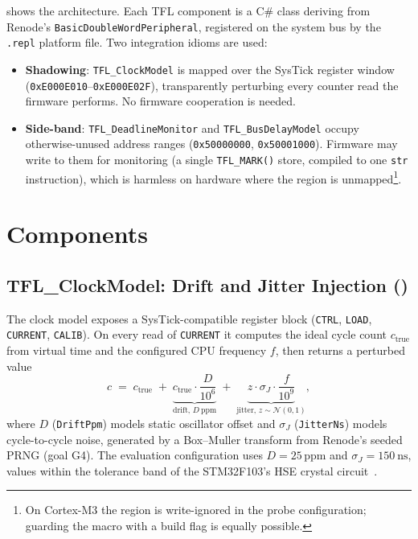  shows the architecture. Each TFL component is a C\#
class deriving from Renode's \texttt{BasicDoubleWordPeripheral},
registered on the system bus by the \texttt{.repl} platform file. Two
integration idioms are used:

\begin{itemize}
  \item \textbf{Shadowing}: \texttt{TFL\_ClockModel} is mapped over the
        SysTick register window (\texttt{0xE000E010}--\texttt{0xE000E02F}),
        transparently perturbing every counter read the firmware
        performs. No firmware cooperation is needed.
  \item \textbf{Side-band}: \texttt{TFL\_DeadlineMonitor} and
        \texttt{TFL\_BusDelayModel} occupy otherwise-unused address
        ranges (\texttt{0x50000000}, \texttt{0x50001000}). Firmware may
        write to them for monitoring (a single \texttt{TFL\_MARK()}
        store, compiled to one \texttt{str} instruction), which is
        harmless on hardware where the region is unmapped\footnote{On
        Cortex-M3 the region is write-ignored in the probe
        configuration; guarding the macro with a build flag is equally
        possible.}.
\end{itemize}

\section{Components}
\label{sec:design:components}

\subsection{TFL\_ClockModel: Drift and Jitter Injection ()}
\label{sec:design:clock}

The clock model exposes a SysTick-compatible register block
(\texttt{CTRL}, \texttt{LOAD}, \texttt{CURRENT}, \texttt{CALIB}). On
every read of \texttt{CURRENT} it computes the ideal cycle count
$c_{\mathrm{true}}$ from virtual time and the configured CPU frequency
$f$, then returns a perturbed value
%
\begin{equation}
  c \;=\; c_{\mathrm{true}}
        \;+\; \underbrace{c_{\mathrm{true}}\cdot
              \frac{D}{10^6}}_{\text{drift, } D~\mathrm{ppm}}
        \;+\; \underbrace{z \cdot \sigma_J \cdot
              \frac{f}{10^9}}_{\text{jitter, } z\sim\mathcal{N}(0,1)},
  \label{eq:clockmodel}
\end{equation}
%
where $D$ (\texttt{DriftPpm}) models static oscillator offset and
$\sigma_J$ (\texttt{JitterNs}) models cycle-to-cycle noise, generated
by a Box--Muller transform from Renode's seeded PRNG (goal G4). The
evaluation configuration uses $D = 25$\,ppm and
$\sigma_J = \SI{150}{\nano\second}$, values within the tolerance band
of the STM32F103's HSE crystal circuit~\cite{stm32rm0008}.

